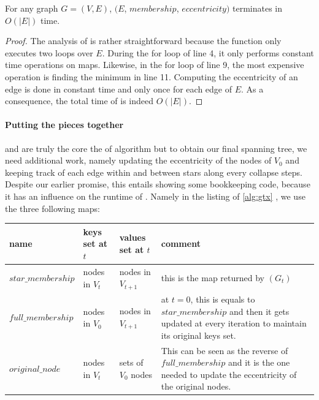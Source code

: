 \begin{prop}
  \label{prop:gtx_time_collapsestar}
  For any graph $G=(V,E)$, \collapseStar$(E$, $membership$, $eccentricity)$ terminates in $O(|E|)$
  time.
\end{prop}
\begin{proof}
  The analysis of \collapseStar{} is rather straightforward because the function only executes two
  loops over $E$. During the for loop of line 4, it only performs constant time
  operations on maps. Likewise, in the for loop of line 9, the most expensive operation is finding the minimum
  in line 11. Computing the eccentricity of an edge is done in constant time and only once for each
  edge of $E$.  As a consequence, the total time of \collapseStar{} is indeed $O(|E|)$.
\end{proof}

\paragraph{Putting the pieces together}\label{par:full_gtx}%
\extractStar{} and \collapseStar{} are truly the core the of \gtx{} algorithm but to obtain our
final spanning tree, we need additional work, namely updating the eccentricity of the nodes of
$V_0$ and keeping track of each edge within and between stars along every collapse steps. Despite
our earlier promise, this entails showing some bookkeeping code, because it has an influence on the
runtime of \gtx{}. 
Namely in the listing of \autoref{alg:gtx} , we use the three following maps:

\vspace{0.5\baselineskip}
\noindent\begin{tabulary}{187mm}{lllL}
  \toprule
  name               & keys set at $t$ & values set at $t$   & comment \\
  \midrule
  $star\_membership$ & nodes in $V_t$  & nodes in $V_{t+1}$  & this is the map returned by
  \extractStar{}$(G_t)$ \\
  $full\_membership$ & nodes in $V_0$  & nodes in $V_{t+1}$  & at $t=0$, this is equals to
  $star\_membership$ and then it gets updated at every iteration to maintain its original keys set.  \\
  $original\_node$   & nodes in $V_t$  & sets of $V_0$ nodes & This can be seen as the reverse of
  $full\_membership$ and it is the one needed to update the eccentricity of the original nodes. \\
  \bottomrule
\end{tabulary}
\vspace{0.5\baselineskip}

